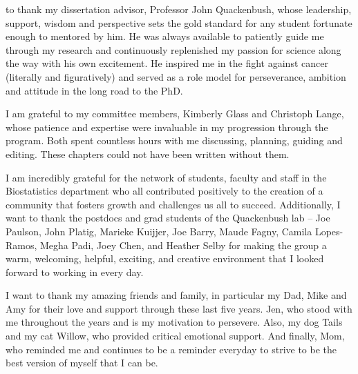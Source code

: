
 to thank my dissertation advisor, Professor John Quackenbush, whose leadership, support, wisdom and perspective sets the gold standard for any student fortunate enough to mentored by him. He was always available to patiently guide me through my research and continuously replenished my passion for science along the way with his own excitement. He inspired me in the fight against cancer (literally and figuratively) and served as a role model for perseverance, ambition and attitude in the long road to the PhD.

I am grateful to my committee members, Kimberly Glass and Christoph Lange, whose patience and expertise were invaluable in my progression through the program. Both spent countless hours with me discussing, planning, guiding and editing. These chapters could not have been written without them.

I am incredibly grateful for the network of students, faculty and staff in the Biostatistics department who all contributed positively to the creation of a community that fosters growth and challenges us all to succeed. Additionally, I want to thank the postdocs and grad students of the Quackenbush lab – Joe Paulson, John Platig, Marieke Kuijjer, Joe Barry, Maude Fagny, Camila Lopes-Ramos, Megha Padi, Joey Chen, and Heather Selby for making the group a warm, welcoming, helpful, exciting, and creative environment that I looked forward to working in every day.

I want to thank my amazing friends and family, in particular my Dad, Mike and Amy for their love and support through these last five years. Jen, who stood with me throughout the years and is my motivation to persevere. Also, my dog Tails and my cat Willow, who provided critical emotional support. And finally, Mom, who reminded me and continues to be a reminder everyday to strive to be the best version of myself that I can be.
